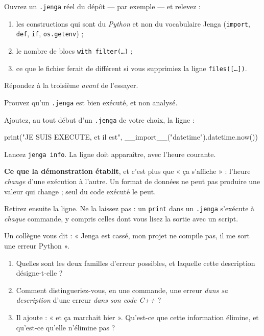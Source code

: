 \begin{nkpratique}
Ouvrez un \texttt{.jenga} réel du dépôt --- par exemple
 --- et relevez :

\begin{enumerate}
\item les constructions qui sont du \emph{Python} et non du vocabulaire Jenga
      (\texttt{import}, \texttt{def}, \texttt{if}, \texttt{os.getenv}) ;
\item le nombre de blocs \texttt{with filter(\dots)} ;
\item ce que le fichier ferait de différent si vous supprimiez la ligne
      \texttt{files([\dots])}.
\end{enumerate}
Répondez à la troisième \emph{avant} de l'essayer.
\end{nkpratique}

\begin{nkdemo}
Prouvez qu'un \texttt{.jenga} est bien exécuté, et non analysé.

Ajoutez, au tout début d'un \texttt{.jenga} de votre choix, la ligne :

\begin{nkcode}{}
print("JE SUIS EXECUTE, et il est", __import__("datetime").datetime.now())
\end{nkcode}

Lancez \texttt{jenga info}. La ligne doit apparaître, avec l'heure courante.

\textbf{Ce que la démonstration établit}, et c'est plus que « ça s'affiche » :
l'heure \emph{change} d'une exécution à l'autre. Un format de données ne peut pas
produire une valeur qui change ; seul du code exécuté le peut.

Retirez ensuite la ligne. \alerte{} Ne la laissez pas : un \texttt{print} dans un
\texttt{.jenga} s'exécute à \emph{chaque} commande, y compris celles dont vous
lisez la sortie avec un script.
\end{nkdemo}

\begin{nklogique}
Un collègue vous dit : « Jenga est cassé, mon projet ne compile pas, il me sort
une erreur Python ».

\begin{enumerate}
\item Quelles sont les deux familles d'erreur possibles, et laquelle cette
      description désigne-t-elle ?
\item Comment distingueriez-vous, en une commande, une erreur \emph{dans sa
      description} d'une erreur \emph{dans son code C++} ?
\item Il ajoute : « et ça marchait hier ». Qu'est-ce que cette information
      élimine, et qu'est-ce qu'elle n'élimine pas ?
\end{enumerate}
\end{nklogique}
